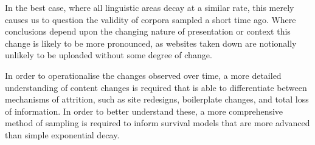 
In the best case, where all linguistic areas decay at a similar rate, this merely causes us to question the validity of corpora sampled a short time ago.  Where conclusions depend upon the changing nature of presentation or context this change is likely to be more pronounced, as websites taken down are notionally unlikely to be uploaded without some degree of change.

In order to operationalise the changes observed over time, a more detailed understanding of content changes is required that is able to differentiate between mechanisms of attrition, such as site redesigns, boilerplate changes, and total loss of information.  In order to better understand these, a more comprehensive method of sampling is required to inform survival models that are more advanced than simple exponential decay.







